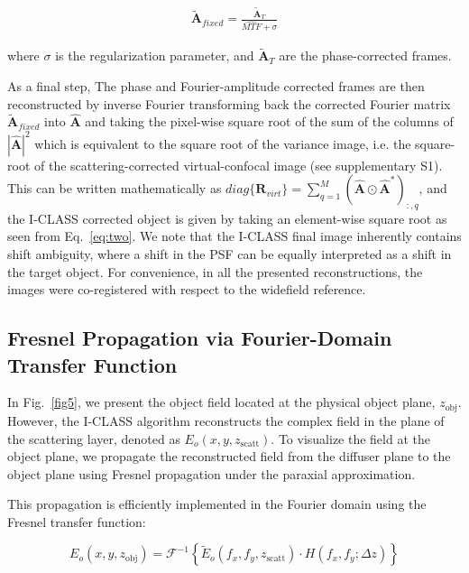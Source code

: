 \documentclass[pdflatex,sn-mathphys-num]{sn-jnl}%
\theoremstyle{thmstyleone}%
\theoremstyle{thmstyletwo}%
\theoremstyle{thmstylethree}%
\begin{document}
\begin{eqnarray}
\tilde{\textbf{A}}_{fixed}=\frac{\tilde{\textbf{A}}_T}{\widehat{MTF}+\sigma}
\end{eqnarray}


\noindent where $\sigma$ is the regularization parameter, and $\tilde{\textbf{A}}_T$ are the phase-corrected frames.  

As a final step, The phase and Fourier-amplitude corrected frames are then reconstructed by inverse Fourier transforming back the corrected Fourier matrix $\tilde{\textbf{A}}_{fixed}$ into $\hat{\textbf{A}}$ and taking the pixel-wise square root of the sum of the columns of $|\hat{\textbf{A}}|^2$ which is equivalent to the square root of the variance image, i.e. the square-root of the scattering-corrected virtual-confocal image (see supplementary S1). This can be written mathematically as $diag\{ \textbf{R}_{virt} \} = \sum_{q=1}^{M} (\hat{\textbf{A}} \odot \hat{\textbf{A}}^*)_{:,q}$, and the I-CLASS corrected object 
is given by taking an element-wise square root as seen from Eq.~\ref{eq:two}. We note that the I-CLASS final image inherently contains shift ambiguity, where a shift in the PSF can be equally interpreted as a shift in the target object. For convenience, in all the presented reconstructions, the images were co-registered with respect to the widefield reference.


\subsection*{Fresnel Propagation via Fourier-Domain Transfer Function}
\label{Fresnel_propagation}
In Fig.~\ref{fig5}, we present the object field located at the physical object plane, $z_{\text{obj}}$. However, the I-CLASS algorithm reconstructs the complex field in the plane of the scattering layer, denoted as $E_o(x, y, z_{\text{scatt}})$. To visualize the field at the object plane, we propagate the reconstructed field from the diffuser plane to the object plane using Fresnel propagation under the paraxial approximation.

This propagation is efficiently implemented in the Fourier domain using the Fresnel transfer function:

\begin{equation}
    E_o(x, y, z_{\text{obj}}) = \mathcal{F}^{-1} \left\{ \tilde{E}_o(f_x, f_y, z_{\text{scatt}}) \cdot H(f_x, f_y; \Delta z) \right\}
\end{equation}
\end{document}
